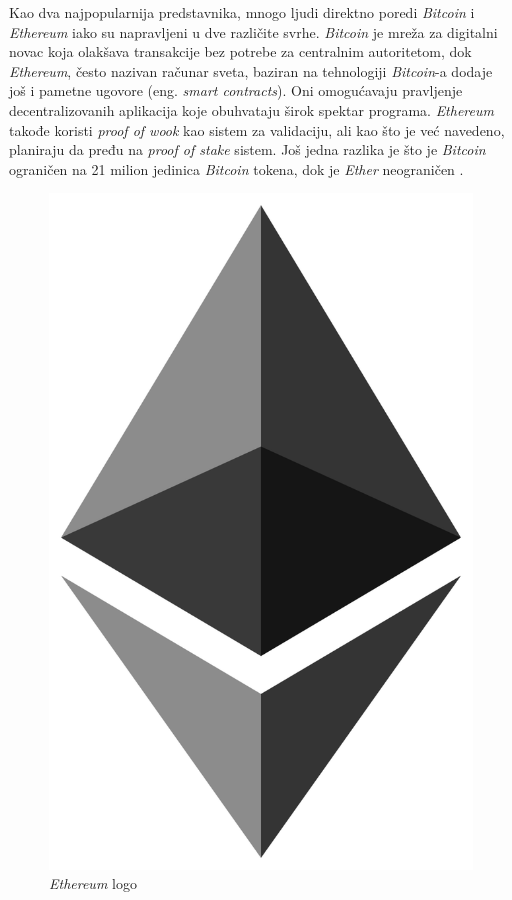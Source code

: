 \documentclass[a4paper]{article}
\begin{document}
{Kao dva najpopularnija predstavnika, mnogo ljudi direktno poredi \emph{Bitcoin} i \emph{Ethereum} iako su napravljeni u dve različite svrhe. \emph{Bitcoin} je mreža za digitalni novac koja olakšava transakcije bez potrebe za centralnim autoritetom, dok \emph{Ethereum}, često nazivan računar sveta, baziran na tehnologiji \emph{Bitcoin}-a dodaje još i pametne ugovore (eng. \emph{smart contracts}). Oni omogućavaju pravljenje decentralizovanih aplikacija koje obuhvataju širok spektar programa. \emph{Ethereum} takođe koristi \emph{proof of wook} kao sistem za validaciju, ali kao što je već navedeno, planiraju da pređu na \emph{proof of stake} sistem. Još jedna razlika je što je \emph{Bitcoin} ograničen na 21 milion jedinica \emph{Bitcoin} tokena, dok je \emph{Ether} neograničen \cite{različitekriptovalute}.


\begin{figure}[h!]
\begin{center}
\includegraphics[scale=0.1]{slike/slika4.png}
\end{center}
\caption{\emph{Ethereum} logo}
\label{fig:ethereum}
\end{figure}


}
\end{document}
